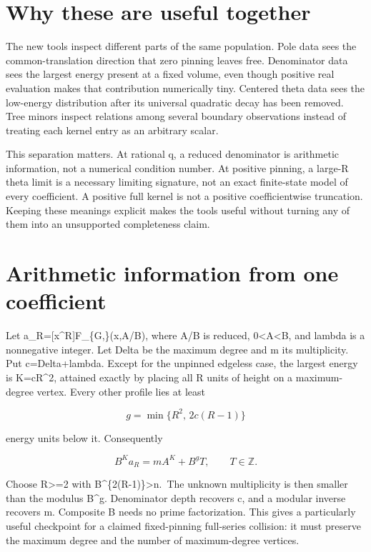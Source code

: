 \documentclass[
  11pt,
  a4paper,
]{report}
\begin{document}
\hypertarget{why-these-are-useful-together}{%
\section{Why these are useful
together}\label{why-these-are-useful-together}}

The new tools inspect different parts of the same population. Pole data
sees the common-translation direction that zero pinning leaves free.
Denominator data sees the largest energy present at a fixed volume, even
though positive real evaluation makes that contribution numerically
tiny. Centered theta data sees the low-energy distribution after its
universal quadratic decay has been removed. Tree minors inspect
relations among several boundary observations instead of treating each
kernel entry as an arbitrary scalar.

This separation matters. At rational q, a reduced denominator is
arithmetic information, not a numerical condition number. At positive
pinning, a large-R theta limit is a necessary limiting signature, not an
exact finite-state model of every coefficient. A positive full kernel is
not a positive coefficientwise truncation. Keeping these meanings
explicit makes the tools useful without turning any of them into an
unsupported completeness claim.

\hypertarget{arithmetic-information-from-one-coefficient}{%
\section{Arithmetic information from one
coefficient}\label{arithmetic-information-from-one-coefficient}}

Let a\_R={[}x\^{}R{]}F\_\{G,\lambda\}(x,A/B), where A/B is reduced,
0\textless A\textless B, and lambda is a nonnegative integer. Let Delta
be the maximum degree and m its multiplicity. Put c=Delta+lambda. Except
for the unpinned edgeless case, the largest energy is K=cR\^{}2,
attained exactly by placing all R units of height on a maximum-degree
vertex. Every other profile lies at least

\[
 g=\min\{R^2,\,2c(R-1)\}
\]

energy units below it. Consequently

\[
 B^K a_R=mA^K+B^g T,\qquad T\in\mathbb Z.
\]

Choose R\textgreater=2 with B\^{}\{2(R-1)\}\textgreater n.~The unknown
multiplicity is then smaller than the modulus B\^{}g. Denominator depth
recovers c, and a modular inverse recovers m. Composite B needs no prime
factorization. This gives a particularly useful checkpoint for a claimed
fixed-pinning full-series collision: it must preserve the maximum degree
and the number of maximum-degree vertices.
\end{document}
